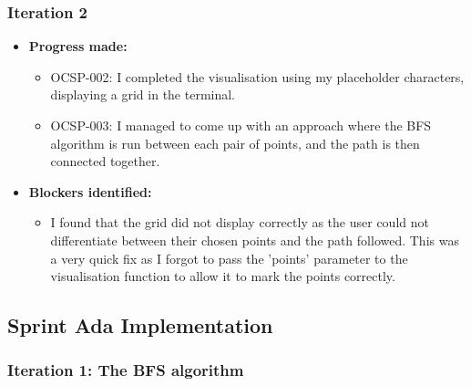 \subsubsection{Iteration 2}
\begin{itemize}
    \item \textbf{Progress made:}
    \begin{itemize}
        \item OCSP-002: I completed the visualisation using my placeholder characters, displaying a grid in the terminal.
        \item OCSP-003: I managed to come up with an approach where the BFS algorithm is run between each pair of points, and the path is then connected together.
    \end{itemize}
    \item \textbf{Blockers identified:}
    \begin{itemize}
        \item I found that the grid did not display correctly as the user could not differentiate between their chosen points and the path followed. This was a very quick fix as I forgot to pass the 'points' parameter to the visualisation function to allow it to mark the points correctly.

    \end{itemize}
\end{itemize}


\clearpage
\subsection{Sprint Ada Implementation}

\subsubsection{Iteration 1: The BFS algorithm}

